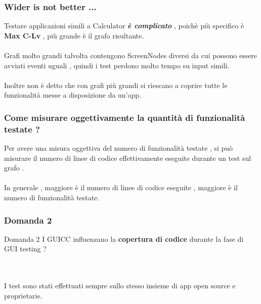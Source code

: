 \documentclass[12pt]{beamer}
\begin{document}

\begin{frame}
\frametitle{Wider is not better ...}
Testare applicazioni simili a Calculator \textbf{\textit{ \`e complicato}} , poich\`e pi\`u specifico \`e \textbf{Max C-Lv} , pi\`u grande \`e il grafo risultante.
\\~\\

Grafi molto grandi talvolta contengono ScreenNodes diversi da cui possono essere avviati eventi uguali , quindi i test perdono molto tempo su input simili.
\\~\\

Inoltre non \`e detto che con grafi pi\`u grandi si riescano a coprire tutte le funzionalit\`a messe a disposizione da un'app. 
\end{frame}


\begin{frame}
\frametitle{Come misurare oggettivamente la quantit\`a di funzionalit\`a testate ?}
Per avere una misura oggettiva del numero di funzionalit\`a testate , si pu\`o misurare il numero di linee di codice effettivamente eseguite durante un test sul grafo .
\\~\\

In generale , maggiore \`e il numero di linee di codice eseguite , maggiore \`e il numero di funzionalit\`a testate.
\end{frame}


\begin{frame}
\frametitle{Domanda 2}
\begin{block}{Domanda 2}
    I GUICC influenzano la \textbf{copertura di codice} durante la fase di GUI testing  ? 
\end{block}
\\~\\

I test sono stati effettuati sempre sullo stesso insieme di app open source e proprietarie.

\end{frame}

\end{document}
